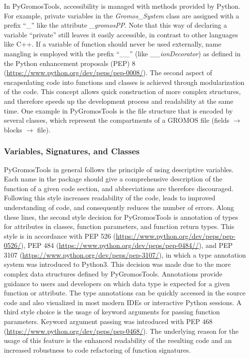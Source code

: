 In PyGromosTools, accessibility is managed with methods provided by Python. For example, private variables in the \textit{Gromos\_System} class are assigned with a prefix ``\_'' like the attribute \textit{\_gromosPP}. Note that this way of declaring a variable ``private'' still leaves it easily accessible, in contrast to other languages like C++. If a variable of function should never be used externally, name mangling is employed with the prefix ``\_\_'' (like \textit{\_\_ionDecorator}) as defined in the Python enhancement proposals (PEP) 8 (\url{https://www.python.org/dev/peps/pep-0008/}).
The second aspect of encapsulating code into functions and classes is achieved through modularization of the code. This concept allows quick construction of more complex structures, and therefore speeds up the development process and readability at the same time.\cite{Ganney2020}
One example in PyGromosTools is the file structure that is encoded by several classes, which represent the compartments of a GROMOS file (fields $\rightarrow$ blocks $\rightarrow$ file).

\subsubsection{Variables, Signatures, and Classes}
PyGromosTools in general follows the principle of using descriptive variables. Each name in the package should give a comprehensive description of the function of a given code section, and abbreviations are therefore discouraged. Following this style increases readability of the code, leads to improved understanding of code, and consequently reduces the number of errors. Along these lines, the second style decision for PyGromosTools is annotation of types for attributes in classes, function parameters, and function return types. This style is in accordance with PEP 526 (\url{https://www.python.org/dev/peps/pep-0526/}), PEP 484 (\url{https://www.python.org/dev/peps/pep-0484//}), and PEP 3107 (\url{https://www.python.org/dev/peps/pep-3107/}), in which a type annotation system was introduced to Python3. This decision was made due to the more complex data structures defined by PyGromosTools. Annotations provide guidance to users and developers on which data type is expected for a given function or attribute. The type annotations can be quickly accessed in the source code and also visualized in most modern IDEs or interactive Python sessions. A third style choice is the usage of keyword arguments for passing function parameters. Keyword argument passing was introduced with PEP 468 (\url{https://www.python.org/dev/peps/pep-0468/}). The underlying reason for the usage of this feature is the enhanced readability of the resulting code and an increased robustness to code refactoring of function signatures.

